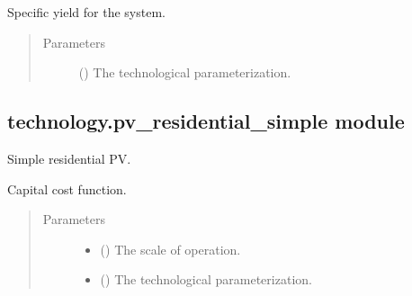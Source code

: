 \documentclass[letterpaper,10pt,english]{sphinxmanual}
\begin{document}
\begin{fulllineitems}
\label{\detokenize{doc-src/technology:technology.pv_residential_generic.specific_yield}}
Specific yield for the system.
\begin{quote}\begin{description}
\item[{Parameters}] \leavevmode
{} () \textendash{} The technological parameterization.

\end{description}\end{quote}

\end{fulllineitems}



\subsection{technology.pv\_residential\_simple module}
\label{\detokenize{doc-src/technology:module-technology.pv_residential_simple}}\label{\detokenize{doc-src/technology:technology-pv-residential-simple-module}}
Simple residential PV.

\begin{fulllineitems}
\label{\detokenize{doc-src/technology:technology.pv_residential_simple.capital_cost}}
Capital cost function.
\begin{quote}\begin{description}
\item[{Parameters}] \leavevmode\begin{itemize}
\item {} 
 () \textendash{} The scale of operation.

\item {} 
 () \textendash{} The technological parameterization.

\end{itemize}

\end{description}\end{quote}

\end{fulllineitems}
\end{document}
